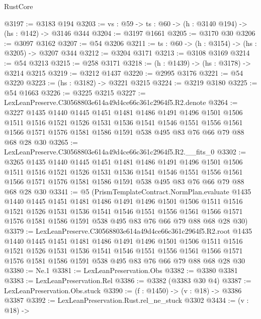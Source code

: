 \begin{lexlean}{RustCore}
\begin{coremodule}
@3197 := @3183 @194
@3203 := {vs : @59} -> {ts : @60} -> (h : @3140 @194) -> (hs : @142) -> @3146 @344
@3204 := @3197 @1661
@3205 := @3170 @30
@3206 := @3097 @3162
@3207 := @54 @3206
@3211 := {ts : @60} -> (h : @3154) -> (hs : @3205) -> @3207 @344
@3212 := @3204 @3171
@3213 := @3108 @3169
@3214 := @54 @3213
@3215 := @258 @3171
@3218 := (h : @1439) -> (hs : @3178) -> @3214 @3215
@3219 := @3212 @1437
@3220 := @2995 @3176
@3221 := @54 @3220
@3223 := (hs : @3182) -> @3221 @3215
@3224 := @3219 @3180
@3225 := @54 @1663
@3226 := @3225 @3215
@3227 := LexLeanPreserve.C30568803e614a49d4ce66c361c2964f5.R2.denote
@3264 := @3227
    @1435
    @1440
    @1445
    @1451
    @1481
    @1486
    @1491
    @1496
    @1501
    @1506
    @1511
    @1516
    @1521
    @1526
    @1531
    @1536
    @1541
    @1546
    @1551
    @1556
    @1561
    @1566
    @1571
    @1576
    @1581
    @1586
    @1591
    @538
    @495
    @83
    @76
    @66
    @79
    @88
    @68
    @28
    @30
@3265 := LexLeanPreserve.C30568803e614a49d4ce66c361c2964f5.R2.__fits_0
@3302 := @3265
    @1435
    @1440
    @1445
    @1451
    @1481
    @1486
    @1491
    @1496
    @1501
    @1506
    @1511
    @1516
    @1521
    @1526
    @1531
    @1536
    @1541
    @1546
    @1551
    @1556
    @1561
    @1566
    @1571
    @1576
    @1581
    @1586
    @1591
    @538
    @495
    @83
    @76
    @66
    @79
    @88
    @68
    @28
    @30
@3341 := @5
    (PrismTemplateContract.NormPlan.evaluate
      @1435
      @1440
      @1445
      @1451
      @1481
      @1486
      @1491
      @1496
      @1501
      @1506
      @1511
      @1516
      @1521
      @1526
      @1531
      @1536
      @1541
      @1546
      @1551
      @1556
      @1561
      @1566
      @1571
      @1576
      @1581
      @1586
      @1591
      @538
      @495
      @83
      @76
      @66
      @79
      @88
      @68
      @28
      @30)
@3379 := LexLeanPreserve.C30568803e614a49d4ce66c361c2964f5.R2.root
    @1435
    @1440
    @1445
    @1451
    @1481
    @1486
    @1491
    @1496
    @1501
    @1506
    @1511
    @1516
    @1521
    @1526
    @1531
    @1536
    @1541
    @1546
    @1551
    @1556
    @1561
    @1566
    @1571
    @1576
    @1581
    @1586
    @1591
    @538
    @495
    @83
    @76
    @66
    @79
    @88
    @68
    @28
    @30
@3380 := Ne.{1}
@3381 := LexLeanPreservation.Obs
@3382 := @3380 @3381
@3383 := LexLeanPreservation.Rel
@3386 := @3382 (@3383 @30 @4)
@3387 := LexLeanPreservation.Obs.stuck
@3390 := (f : @1450) -> (v : @18) -> @3386 @3387
@3392 := LexLeanPreservation.Rust.rel_ne_stuck @3302
@3434 := (v : @18) ->

\end{coremodule}
\end{lexlean}

